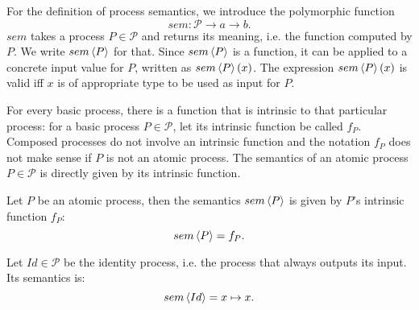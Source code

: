 For the definition of process semantics, we introduce the polymorphic function 
\begin{equation*}
  sem \colon \mathcal{P} \to a \to b.
\end{equation*}
$sem$ takes a process $P \in \mathcal{P}$ and returns its meaning, i.e. the function computed by $P$. We write $sem \left\langle P \right\rangle$ for that. Since $sem \left\langle P \right\rangle$ is a function, it can be applied to a concrete input value for $P$, written as $sem \left\langle P \right\rangle \left( x \right)$. The expression $sem \left\langle P \right\rangle \left( x \right)$ is valid iff $x$ is of appropriate type to be used as input for $P$.

For every basic process, there is a function that is intrinsic to that particular process: for a basic process $P \in \mathcal{P}$, let its intrinsic function be called $f_P$. Composed processes do not involve an intrinsic function and the notation $f_P$ does not make sense if $P$ is not an atomic process. The semantics of an atomic process $P \in \mathcal{P}$ is directly given by its intrinsic function.
\begin{definition}
  \label{def:sem_atomic}
  Let $P$ be an atomic process, then the semantics $sem \left\langle P \right\rangle$ is given by $P$'s intrinsic function $f_P$:
  \begin{equation*}
    \label{eqn:sem_atomic}
    sem \left\langle P \right\rangle = f_P.
  \end{equation*}
  \vspace*{-0.5em}
  \hfill\qedsymbol
\end{definition}

\begin{definition}
\label{def:sem_id}
Let $Id \in \mathcal{P}$ be the identity process, i.e. the process that always outputs its input. Its semantics is:
\begin{equation*}
  \label{eqn:sem_id}
  sem \left\langle Id \right\rangle = x \mapsto x.
\end{equation*}
  \vspace*{-0.5em}
  \hfill\qedsymbol
\end{definition}


